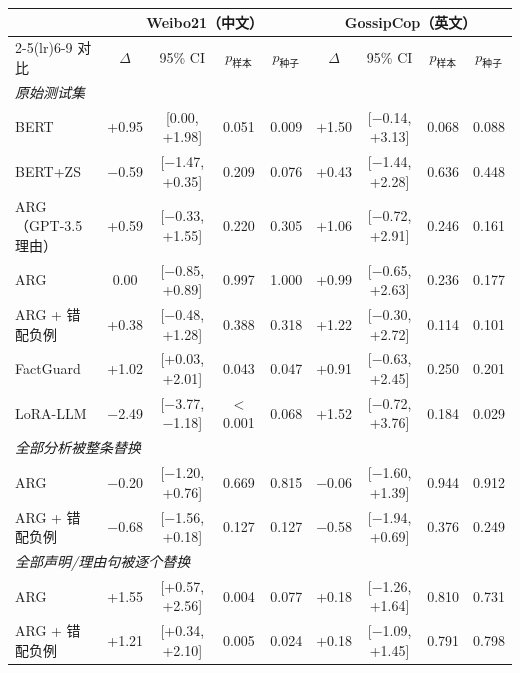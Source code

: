 \begin{tabular}{lcccccccc}
\toprule
 & \multicolumn{4}{c}{Weibo21（中文）} & \multicolumn{4}{c}{GossipCop（英文）} \\
\cmidrule(lr){2-5}\cmidrule(lr){6-9}
\method{} 对比 & $\Delta$ & 95\% CI & $p_{\text{样本}}$ & $p_{\text{种子}}$ & $\Delta$ & 95\% CI & $p_{\text{样本}}$ & $p_{\text{种子}}$ \\
\midrule
\multicolumn{9}{l}{\emph{原始测试集}} \\
BERT & +0.95 & [0.00, +1.98] & 0.051 & 0.009 & +1.50 & [$-$0.14, +3.13] & 0.068 & 0.088 \\
BERT+ZS & $-$0.59 & [$-$1.47, +0.35] & 0.209 & 0.076 & +0.43 & [$-$1.44, +2.28] & 0.636 & 0.448 \\
ARG（GPT-3.5 理由） & +0.59 & [$-$0.33, +1.55] & 0.220 & 0.305 & +1.06 & [$-$0.72, +2.91] & 0.246 & 0.161 \\
ARG & 0.00 & [$-$0.85, +0.89] & 0.997 & 1.000 & +0.99 & [$-$0.65, +2.63] & 0.236 & 0.177 \\
ARG + 错配负例 & +0.38 & [$-$0.48, +1.28] & 0.388 & 0.318 & +1.22 & [$-$0.30, +2.72] & 0.114 & 0.101 \\
FactGuard & +1.02 & [+0.03, +2.01] & 0.043 & 0.047 & +0.91 & [$-$0.63, +2.45] & 0.250 & 0.201 \\
LoRA-LLM & $-$2.49 & [$-$3.77, $-$1.18] & $<$0.001 & 0.068 & +1.52 & [$-$0.72, +3.76] & 0.184 & 0.029 \\
\midrule
\multicolumn{9}{l}{\emph{全部分析被整条替换}} \\
ARG & $-$0.20 & [$-$1.20, +0.76] & 0.669 & 0.815 & $-$0.06 & [$-$1.60, +1.39] & 0.944 & 0.912 \\
ARG + 错配负例 & $-$0.68 & [$-$1.56, +0.18] & 0.127 & 0.127 & $-$0.58 & [$-$1.94, +0.69] & 0.376 & 0.249 \\
\midrule
\multicolumn{9}{l}{\emph{全部声明/理由句被逐个替换}} \\
ARG & +1.55 & [+0.57, +2.56] & 0.004 & 0.077 & +0.18 & [$-$1.26, +1.64] & 0.810 & 0.731 \\
ARG + 错配负例 & +1.21 & [+0.34, +2.10] & 0.005 & 0.024 & +0.18 & [$-$1.09, +1.45] & 0.791 & 0.798 \\
\bottomrule
\end{tabular}

